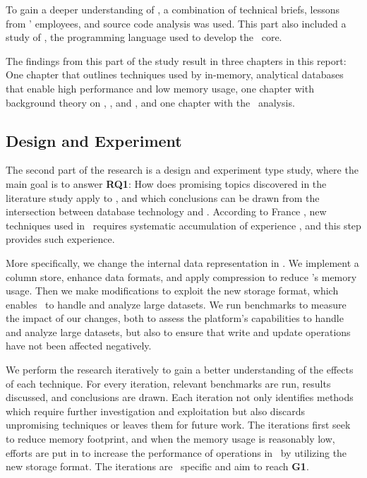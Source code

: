 To gain a deeper understanding of \gap, a combination of technical briefs, lessons from \genus' employees, and source code analysis was used.  This part also included a study of \delphi, the programming language used to develop the \gap~core.

The findings from this part of the study result in three chapters in this report: One chapter that outlines techniques used by in-memory, analytical databases that enable high performance and low memory usage, one chapter with background theory on \mde, \bd, and \delphi, and one chapter with the \gap~analysis.

\subsection{Design and Experiment}
\label{sub:Design and Experiment}
The second part of the research is a design and experiment type study, where the main goal is to answer \textbf{RQ1}: How does promising topics discovered in the literature study apply to \gap, and which conclusions can be drawn from the intersection between database technology and \mde. According to France \ea, new techniques used in \mde~requires systematic accumulation of experience \cite{France2007-ae}, and this step provides such experience.

More specifically, we change the internal data representation in \gap. We implement a column store, enhance data formats, and apply compression to reduce \gap's memory usage. Then we make modifications to exploit the new storage format, which enables \gap~to handle and analyze large datasets. We run benchmarks to measure the impact of our changes, both to assess the platform's capabilities to handle and analyze large datasets, but also to ensure that write and update operations have not been affected negatively. 

We perform the research iteratively to gain a better understanding of the effects of each technique. For every iteration, relevant benchmarks are run, results discussed, and conclusions are drawn. Each iteration not only identifies methods which require further investigation and exploitation but also discards unpromising techniques or leaves them for future work. The iterations first seek to reduce memory footprint, and when the memory usage is reasonably low, efforts are put in to increase the performance of operations in \gap~by utilizing the new storage format. The iterations are \gap~specific and aim to reach \textbf{G1}. 

